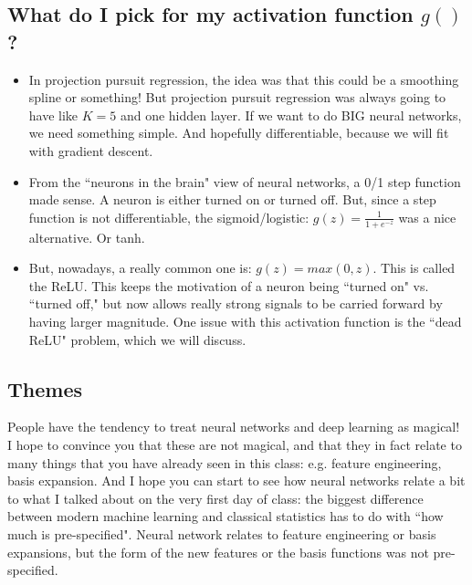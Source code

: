\subsection{What do I pick for my activation function $g()$?}
\begin{itemize}
\item In projection pursuit regression, the idea was that this could be a smoothing spline or something! But projection pursuit regression was always going to have like $K=5$ and one hidden layer. If we want to do BIG neural networks, we need something simple. And hopefully differentiable, because we will fit with gradient descent. 
\item From the ``neurons in the brain" view of neural networks, a 0/1 step function made sense. A neuron is either turned on or turned off. But, since a step function is not differentiable, the sigmoid/logistic: $g(z) = \frac{1}{1+e^{-z}}$ was a nice alternative. Or tanh. 
\item But, nowadays, a really common one is: $g(z) = max(0,z)$. This is called the ReLU. This keeps the motivation of a neuron being ``turned on" vs. ``turned off," but now allows really strong signals to be carried forward by having larger magnitude. One issue with this activation function is the ``dead ReLU" problem, which we will discuss. 
\end{itemize}





\subsection{Themes}

People have the tendency to treat neural networks and deep learning as magical! I hope to convince you that these are not magical, and that they in fact relate to many things that you have already seen in this class: e.g. feature engineering, basis expansion. And I hope you can start to see how neural networks relate a bit to what I talked about on the very first day of class: the biggest difference between modern machine learning and classical statistics has to do with ``how much is pre-specified". Neural network relates to feature engineering or basis expansions, but the form of the new features or the basis functions was not pre-specified.

